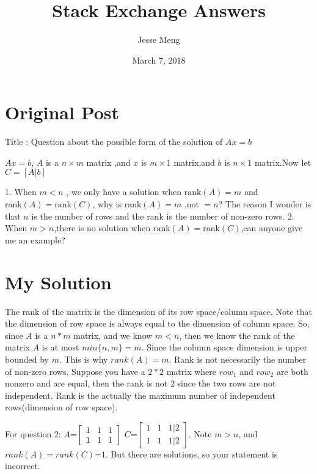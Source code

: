 \documentclass{article}
\title{Stack Exchange Answers}
\author{Jesse Meng }
\date{March 7, 2018}
\begin{document}
\maketitle

\section{Original Post}
Title : Question about the possible form of the solution of $Ax=b$

$Ax=b$, $A$ is a $n\times m$ matrix ,and $x$ is $m\times 1$ matrix,and $b$ is $n\times 1$ matrix.Now let $C =[A|b ]$

 1. When $m<n$ , we only have a solution when $\text{rank}(A)=m$ and $\text{rank}(A)=\text{rank}(C)$, why is $\text{rank}(A)=m$ ,not $=n$? The reason I wonder is that $n$ is the number of rows and the rank is the number of non-zero rows.
 2. When $m>n$,there is no solution when $\text{rank}(A)=\text{rank}(C)$,can anyone give me an example?
\section{My Solution}
The rank of the matrix is the dimension of its row space/column space. Note that the dimension of row space is always equal to the dimension of column space. So, since $A$ is a $n*m$ matrix, and we know $m<n$, then we know the rank of the matrix $A$ is at most $min\{n,m\}=m$. Since the column space dimension is upper bounded by $m$. This is why $rank(A)=m$. Rank is not necessarily the number of non-zero rows. Suppose you have a $2*2$ matrix where $row_1$ and $row_2$ are both nonzero and are equal, then the rank is not $2$ since the two rows are not independent. Rank is the actually the maximum number of independent rows(dimension of row space).

For question $2$:
$A$=$\begin{bmatrix} 1&1&1 \\ 1&1&1\end{bmatrix}$
$C$=$\begin{bmatrix} 1&1&1|2 \\ 1&1&1|2\end{bmatrix}$. Note $m>n$, and $rank(A)=rank(C)$=$1$. But there are solutions, so your statement is incorrect.
\end{document}
